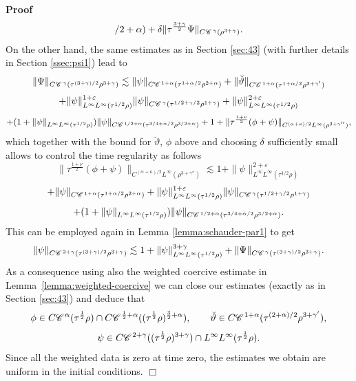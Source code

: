 \documentclass[a4paper,11pt]{article}
\newenvironment{proof}{\noindent\textbf{Proof\ }}{\hspace*{\fill}$\Box$\medskip}
\numberwithin{equation}{section}
\newcommand{\CC}{\mathscr{C} \hspace{.1em}}
\newcommand{\8}{\infty}
\begin{document}
\begin{proof}
\[{{     / 2 + \alpha})} +\delta \| \tau^{\frac{3 + \gamma}{2}} \Psi \|_{C
     \CC^{\gamma} ( \rho^{3 + \gamma})} .
\]
On the other hand, the same estimates as in Section \ref{sec:43} (with further details in Section \ref{ssec:psi1}) lead to
  \[ \| \Psi \|_{C \CC^{\gamma} (\tau^{(3 + \gamma) / 2} \rho^{3 + \gamma})}
     \lesssim \| \psi \|_{C \CC^{1 + \alpha} (\tau^{1 + \alpha / 2} \rho^{2 +
     \alpha})} + \| \breve{\vartheta} \|_{C \CC^{1 + \alpha} (\tau^{1 + \alpha
     / 2} \rho^{3 +\gamma'})} \]
  \[ + \| \psi \|_{L^{\infty} L^{\infty} (\tau^{1 / 2} \rho)}^{1 +
     \varepsilon} \| \psi \|_{C \CC^{\gamma} (\tau^{1 / 2 + \gamma / 2}
     \rho^{1 + \gamma})} + \| \psi \|_{L^{\infty} L^{\infty} (\tau^{1 / 2}
     \rho)}^{2 + \varepsilon} \]
  \[ + (1 + \| \psi \|_{L^{\infty} L^{\infty} (\tau^{1 / 2} \rho)}) \| \psi
     \|_{C \CC^{1 / 2 + \alpha} (\tau^{3 / 4 + \alpha / 2} \rho^{3 / 2 +
     \alpha})} + 1 + \| \tau^{\frac{1 + \nu}{2}} (\phi + \psi) \|_{C^{(\alpha + \kappa) / 2}
     L^{\infty} (\rho^{3 + \gamma''})},\]
  which together with the bound for $\breve{\vartheta}$, $\phi$ above and choosing $\delta$ sufficiently small allows to control the time regularity as follows
\[ \| \tau^{\frac{1 + \nu}{2}} (\phi + \psi) \|_{C^{(\alpha + \kappa) / 2}
     L^{\infty} (\rho^{3 + \gamma''})} \lesssim 1+ \|
      \psi \|^{2+\varepsilon}_{L^{\infty} L^{\infty} (\tau^{1 / 2} \rho)}  \]
  \[+ \| \psi \|_{C \CC^{1 + \alpha} (\tau^{1 + \alpha / 2} \rho^{2 +
     \alpha})}  + \| \psi \|_{L^{\infty} L^{\infty} (\tau^{1 / 2} \rho)}^{1 +
     \varepsilon} \| \psi \|_{C \CC^{\gamma} (\tau^{1 / 2 + \gamma / 2}
     \rho^{1 + \gamma})} \]
  \[ + (1 + \| \psi \|_{L^{\infty} L^{\infty} (\tau^{1 / 2} \rho)}) \| \psi
     \|_{C \CC^{1 / 2 + \alpha} (\tau^{3 / 4 + \alpha / 2} \rho^{3 / 2 +
     \alpha})}.\]
This
  can be employed again in Lemma \ref{lemma:schauder-par1} to get
  \[ \| \psi \|_{C \CC^{2 + \gamma} (\tau^{(3 + \gamma) / 2} \rho^{3 +
     \gamma})} \lesssim 1+ \| \psi \|^{3+\gamma}_{L^{\infty} L^{\infty} (\tau^{1 / 2} \rho)}
     + \| \Psi \|_{C \CC^{\gamma_{}} (\tau^{(3 + \gamma) / 2} \rho^{3 +
     \gamma})} . \]
  As a consequence using also the weighted coercive estimate in
  Lemma~\ref{lemma:weighted-coercive} we can close our estimates (exactly as
  in Section \ref{sec:43}) and deduce that
  \[ \phi \in C \CC^{\alpha} (\tau^{\frac{1}{2}} \rho) \cap C \CC^{\frac{1}{2}
     + \alpha} ((\tau^{\frac{1}{2}} \rho)^{\frac{3}{2} + \alpha}), \qquad
     \breve{\vartheta} \in C \CC^{1 + \alpha}_{} (\tau^{(2 + \alpha) / 2}
     \rho_{}^{3 + \gamma'}), \]
  \[ \psi \in C \CC^{2 + \gamma} ((\tau^{\frac{1}{2}} \rho)^{3 + \gamma})  \cap
     L^{\infty} L^{\infty} (\tau^{\frac{1}{2}} \rho) . \]
  Since all the weighted data is zero at time zero, the estimates we obtain
  are uniform in the initial conditions.
\end{proof}
\end{document}
